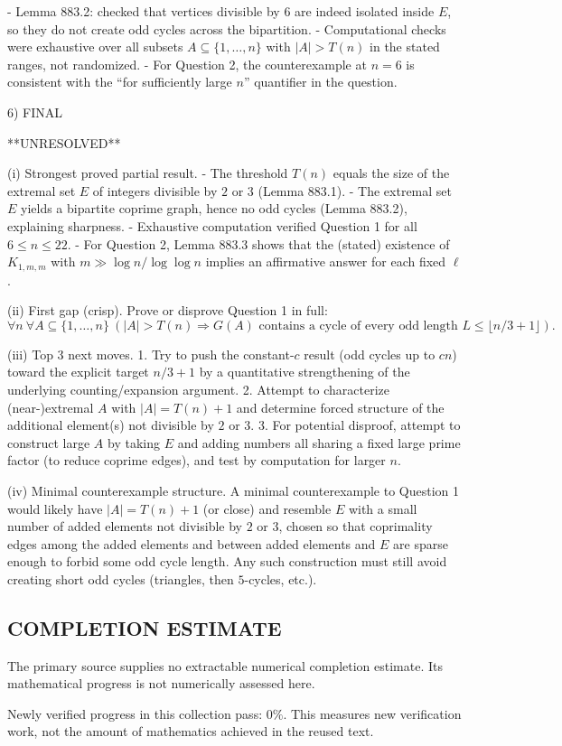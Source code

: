 - Lemma 883.2: checked that vertices divisible by $6$ are indeed isolated inside $E$, so they do not create odd cycles across the bipartition.
- Computational checks were exhaustive over all subsets $A\subseteq\{1,\dots,n\}$ with $|A|>T(n)$ in the stated ranges, not randomized.
- For Question 2, the counterexample at $n=6$ is consistent with the “for sufficiently large $n$” quantifier in the question.

6) FINAL

**UNRESOLVED**

(i) Strongest proved partial result.
- The threshold $T(n)$ equals the size of the extremal set $E$ of integers divisible by $2$ or $3$ (Lemma 883.1).
- The extremal set $E$ yields a bipartite coprime graph, hence no odd cycles (Lemma 883.2), explaining sharpness.
- Exhaustive computation verified Question 1 for all $6\le n\le 22$.
- For Question 2, Lemma 883.3 shows that the (stated) existence of $K_{1,m,m}$ with $m\gg \log n/\log\log n$ implies an affirmative answer for each fixed $\ell$.

(ii) First gap (crisp).
Prove or disprove Question 1 in full:
\[\forall n\ \forall A\subseteq\{1,\dots,n\}\ (|A|>T(n)\Rightarrow G(A)\text{ contains a cycle of every odd length }L\le \lfloor n/3+1\rfloor).\]

(iii) Top 3 next moves.
1. Try to push the constant-$c$ result (odd cycles up to $c n$) toward the explicit target $n/3+1$ by a quantitative strengthening of the underlying counting/expansion argument.
2. Attempt to characterize (near-)extremal $A$ with $|A|=T(n)+1$ and determine forced structure of the additional element(s) not divisible by $2$ or $3$.
3. For potential disproof, attempt to construct large $A$ by taking $E$ and adding numbers all sharing a fixed large prime factor (to reduce coprime edges), and test by computation for larger $n$.

(iv) Minimal counterexample structure.
A minimal counterexample to Question 1 would likely have $|A|=T(n)+1$ (or close) and resemble $E$ with a small number of added elements not divisible by $2$ or $3$, chosen so that coprimality edges among the added elements and between added elements and $E$ are sparse enough to forbid some odd cycle length. Any such construction must still avoid creating short odd cycles (triangles, then $5$-cycles, etc.).




\subsection*{COMPLETION ESTIMATE}
The primary source supplies no extractable numerical completion estimate. Its mathematical progress is not numerically assessed here.

Newly verified progress in this collection pass: $0\%$. This measures new verification work, not the amount of mathematics achieved in the reused text.
